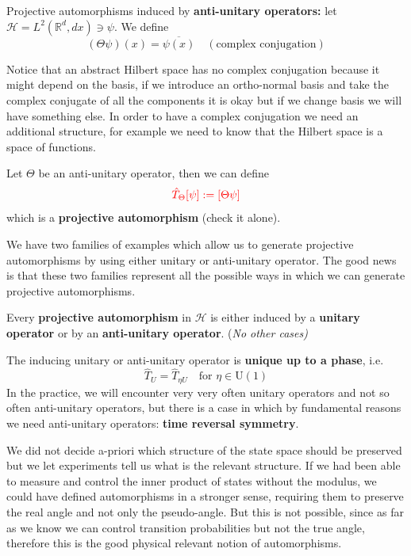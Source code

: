 \documentclass[../main.tex]{subfiles}
\begin{document}
\begin{example}
Projective automorphisms induced by \textbf{anti-unitary operators:} let $\mathcal{H}=L^2(\mathbb{R}^d,dx)\ni\psi$. We define \[
(\Theta\psi)(x)=\overline{\psi(x)} \quad (\textrm{complex conjugation})
\]
\end{example}
Notice that an abstract Hilbert space has no complex conjugation because it might depend on the basis, if we introduce an ortho-normal basis and take the complex conjugate of all the components it is okay but if we change basis we will have something else. In order to have a complex conjugation we need an additional structure, for example we need to know that the Hilbert space is a space of functions.

Let $\Theta$ be an anti-unitary operator, then we can define \[
{\color{red}\hat{T}_{\Theta}[\psi]:=[\Theta\psi]}
\]which is a \textbf{projective automorphism} (check it alone).

We have two families of examples which allow us to generate projective automorphisms by using either unitary or anti-unitary operator. The good news is that these two families represent all the possible ways in which we can generate projective automorphisms.
\begin{theorem}[Wigner]
Every \textbf{projective automorphism} in $\mathcal{H}$ is either induced by a \textbf{unitary operator} or by an \textbf{anti-unitary operator}. (\textit{No other cases)}
\end{theorem}
The inducing unitary or anti-unitary operator is \textbf{unique up to a phase}, i.e.
\[
\hat{T}_U=\hat{T}_{\eta U} \quad \textrm{for }\eta\in\textrm{U}(1)
\]
In the practice, we will encounter very very often unitary operators and not so often anti-unitary operators, but there is a case in which by fundamental reasons we need anti-unitary operators: \textbf{time reversal symmetry}.

We did not decide a-priori which structure of the state space should be preserved but we let experiments tell us what is the relevant structure. If we had been able to measure and control the inner product of states without the modulus, we could have defined automorphisms in a stronger sense, requiring them to preserve the real angle and not only the pseudo-angle. But this is not possible, since as far as we know we can control transition probabilities but not the true angle, therefore this is the good physical relevant notion of automorphisms.
\end{document}
